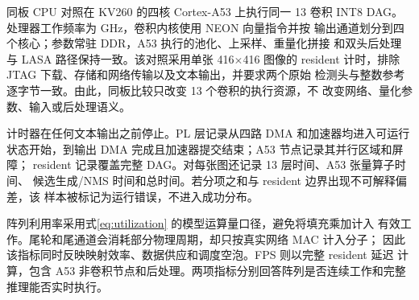 同板 CPU 对照在 KV260 的四核 Cortex-A53 上执行同一 13 卷积 INT8 DAG。
处理器工作频率为 \CPUFourCoreClockGHz{} GHz，卷积内核使用 NEON 向量指令并按
输出通道划分到四个核心；参数常驻 DDR，A53 执行的池化、上采样、重量化拼接
和双头后处理与 LASA 路径保持一致。该对照采用单张 416$\times$416 图像的
resident 计时，排除 JTAG 下载、存储和网络传输以及文本输出，并要求两个原始
检测头与整数参考逐字节一致。由此，同板比较只改变 13 个卷积的执行资源，不
改变网络、量化参数、输入或后处理语义。

计时器在任何文本输出之前停止。PL 层记录从四路 DMA 和加速器均进入可运行
状态开始，到输出 DMA 完成且加速器提交结束；A53 节点记录其并行区域和屏障；
resident 记录覆盖完整 DAG。对每张图还记录 13 层时间、A53 张量算子时间、
候选生成/NMS 时间和总时间。若分项之和与 resident 边界出现不可解释偏差，该
样本被标记为运行错误，不进入成功分布。

阵列利用率采用式\eqref{eq:utilization} 的模型运算量口径，避免将填充乘加计入
有效工作。尾轮和尾通道会消耗部分物理周期，却只按真实网络 MAC 计入分子；
因此该指标同时反映映射效率、数据供应和调度空泡。FPS 则以完整 resident 延迟
计算，包含 A53 非卷积节点和后处理。两项指标分别回答阵列是否连续工作和完整
推理能否实时执行。
